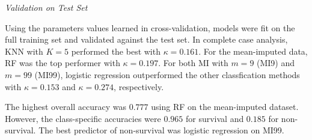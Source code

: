 \documentclass[12pt,]{article}
\begin{document}
\emph{Validation on Test Set}

Using the parameters values learned in cross-validation, models were fit
on the full training set and validated against the test set. In complete
case analysis, KNN with \(K=5\) performed the best with
\(\kappa=0.161\). For the mean-imputed data, RF was the top performer
with \(\kappa=0.197\). For both MI with \(m=9\) (MI9) and \(m=99\)
(MI99), logistic regression outperformed the other classfication methods
with \(\kappa=0.153\) and \(\kappa=0.274\), respectively.

The highest overall accuracy was \(0.777\) using RF on the mean-imputed
dataset. However, the class-specific accuracies were \(0.965\) for
survival and \(0.185\) for non-survival. The best predictor of
non-survival was logistic regression on MI99.
\end{document}
